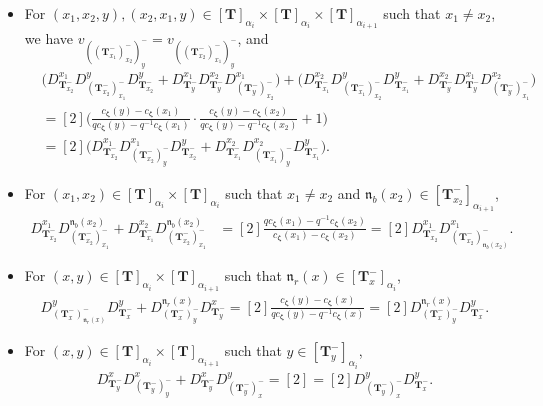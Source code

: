 \documentclass[12pt]{amsart}
\numberwithin{equation}{thm}
\newcommand\bT{\mathbf T}
\newcommand\fn{\mathfrak n}
\renewcommand\a{\alpha}  %
\newcommand\Bz{\boldsymbol\zeta}
\begin{document}
\begin{itemize}
\item 
For $(x_1,x_2,y), (x_2,x_1,y) \in [\bT]_{\a_i} \times [\bT]_{\a_i} \times [\bT]_{\a_{i+1}}$ such that $x_1 \not=x_2$, 
we have $v_{((\bT_{x_1}^-)_{x_2}^-)_y^-} = v_{((\bT_{x_2}^-)_{x_1}^-)_y^-}$, and 
\begin{align*}
&\big( D_{\bT_{x_2}^-}^{x_1} D_{(\bT_{x_2}^-)_{x_1}^-}^y D_{\bT_{x_2}^-}^y 
		+ D_{\bT_y^-}^{x_1} D_{\bT_y^-}^{x_2} D_{(\bT_y^-)_{x_2}^-}^{x_1} \big) 
	+ \big( D_{\bT_{x_1}^-}^{x_2} D_{(\bT_{x_1}^-)_{x_2}^-}^y D_{\bT_{x_1}^-}^y 
		+ D_{\bT_y^-}^{x_2} D_{\bT_y^-}^{x_1} D_{(\bT_y^-)_{x_1}^-}^{x_2} \big) 
\\
&= [2] \Big( \frac{ c_{\Bz}(y) - c_{\Bz}(x_1) }{ q c_{\Bz}(y) - q^{-1} c_{\Bz} (x_1) } 
			\cdot \frac{ c_{\Bz}(y) - c_{\Bz} (x_2) }{ q c_{\Bz} (y) - q^{-1} c_{\Bz} (x_2) } +1 \Big)
\\
&= [2] \big( D_{\bT_{x_2}^-}^{x_1} D_{(\bT_{x_2}^-)_y^-}^{x_1} D_{\bT_{x_2}^-}^y 
			+  D_{\bT_{x_1}^-}^{x_2} D_{(\bT_{x_1}^-)_y^-}^{x_2} D_{\bT_{x_1}^-}^y \big). 
\end{align*}

\item 
For $(x_1,x_2) \in [\bT]_{\a_i} \times [\bT]_{\a_i}$ such that $x_1 \not=x_2$ and $\fn_b (x_2) \in [\bT_{x_2}^-]_{\a_{i+1}}$, 
\begin{align*}
D_{\bT_{x_2}^-}^{x_1} D_{(\bT_{x_2}^-)_{x_1}^-}^{\fn_b(x_2)} + D_{\bT_{x_1}^-}^{x_2} D_{(\bT_{x_2}^-)_{x_1}^-}^{\fn_b (x_2)} 
&= [2] \frac{  q c_{\Bz} (x_1) - q^{-1} c_{\Bz} (x_2)  }{  c_{\Bz} (x_1) - c_{\Bz} (x_2) } 
= [2] D_{\bT_{x_2}^-}^{x_1} D_{(\bT_{x_2}^-)_{\fn_b(x_2)}^-}^{x_1}.  
\end{align*}

\item  
For $(x,y) \in [\bT]_{\a_i} \times [\bT]_{\a_{i+1}} $ such that  $\fn_r (x) \in [\bT_x^-]_{\a_i}$, 
\begin{align*}
D_{(\bT_x^-)_{\fn_r(x)}^-}^y D_{\bT_x^-}^y + D_{(\bT_x^-)_y^-}^{\fn_r(x)} D_{\bT_y^-}^x 
= [2] \frac{ c_{\Bz} (y) - c_{\Bz}(x)}{ q c_{\Bz}(y) - q^{-1} c_{\Bz} (x)} 
=[2] D_{(\bT_x^-)_y^-}^{\fn_r(x)} D_{\bT_x^-}^y. 
\end{align*}

\item 
For $(x,y) \in [\bT]_{\a_i} \times [\bT]_{\a_{i+1}}$ such that $y \in [\bT_y^-]_{\a_i}$, 
\begin{align*}
D_{\bT_y^-}^x D_{(\bT_y^-)_y^-}^x + D_{\bT_y^-}^x D_{(\bT_y^-)_x^-}^y 
= [2] 
= [2] D_{(\bT_y^-)_x^-}^y D_{\bT_x^-}^y. 
\end{align*}


\end{itemize}
\end{document}
